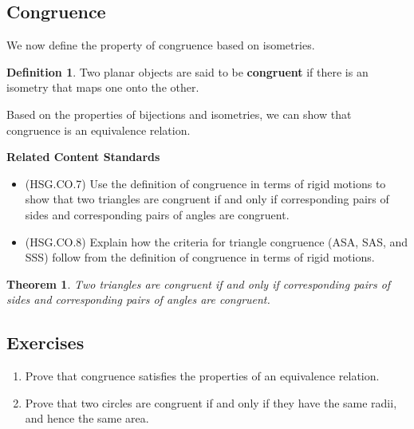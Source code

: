 \documentclass[
]{book}
\providecommand{\tightlist}{%
  \setlength{\itemsep}{0pt}\setlength{\parskip}{0pt}}
\newenvironment{standards}{}{}
\newtheorem{theorem}{Theorem}[chapter]
\theoremstyle{definition}
\newtheorem{definition}{Definition}[chapter]
\theoremstyle{definition}
\theoremstyle{definition}
\theoremstyle{definition}
\theoremstyle{remark}
\begin{document}
\hypertarget{congruence}{%
\subsection{Congruence}\label{congruence}}

We now define the property of congruence based on isometries.

\begin{definition}
Two planar objects are said to be \textbf{congruent} if there is an isometry that maps one onto the other.
\end{definition}

Based on the properties of bijections and isometries, we can show that congruence is an equivalence relation.

\begin{standards}

\begin{center}
\textbf{Related Content Standards}

\end{center}

\begin{itemize}
\tightlist
\item
  (HSG.CO.7) Use the definition of congruence in terms of rigid motions to show that two triangles are congruent if and only if corresponding pairs of sides and corresponding pairs of angles are congruent.\\
\item
  (HSG.CO.8) Explain how the criteria for triangle congruence (ASA, SAS, and SSS) follow from the definition of congruence in terms of rigid motions.
\end{itemize}

\end{standards}

\begin{theorem}
Two triangles are congruent if and only if corresponding pairs of sides and corresponding pairs of angles are congruent.
\end{theorem}

\hypertarget{exercises-51}{%
\subsection{Exercises}\label{exercises-51}}

\begin{enumerate}
\def\labelenumi{\arabic{enumi}.}
\item
  Prove that congruence satisfies the properties of an equivalence relation.
\item
  Prove that two circles are congruent if and only if they have the same radii, and hence the same area.
\end{enumerate}
\end{document}
